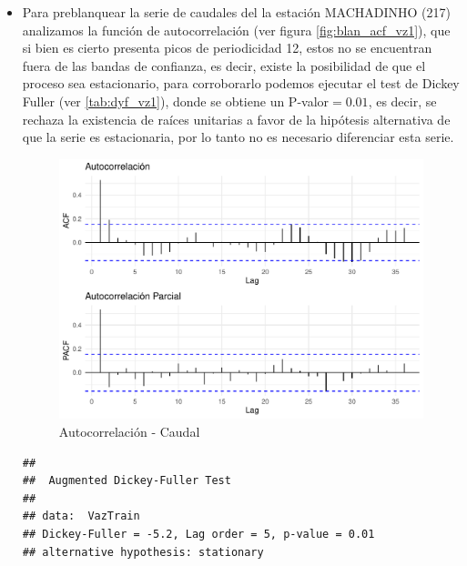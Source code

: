 \documentclass[12pt,oneside]{book}\usepackage[]{graphicx}\usepackage[]{color}
\makeatletter
\def\maxwidth{ %
  \ifdim\Gin@nat@width>\linewidth
    \linewidth
  \else
    \Gin@nat@width
  \fi
}
\newenvironment{kframe}{%
 \def\at@end@of@kframe{}%
 \ifinner\ifhmode%
  \def\at@end@of@kframe{\end{minipage}}%
  \begin{minipage}{\columnwidth}%
 \fi\fi%
 \def\FrameCommand##1{\hskip\@totalleftmargin \hskip-\fboxsep
 \colorbox{shadecolor}{##1}\hskip-\fboxsep
     \hskip-\linewidth \hskip-\@totalleftmargin \hskip\columnwidth}%
 \MakeFramed {\advance\hsize-\width
   \@totalleftmargin\z@ \linewidth\hsize
   \@setminipage}}%
 {\par\unskip\endMakeFramed%
 \at@end@of@kframe}
\newenvironment{knitrout}{}{} %
\theoremstyle{definition} %
\makeatother
\begin{document}
\begin{itemize}
\item Para preblanquear la serie de caudales del la estación MACHADINHO (217) analizamos la función de autocorrelación  (ver figura \ref{fig:blan_acf_vz1}), que si bien es cierto presenta picos de periodicidad 12, estos no se encuentran fuera de las bandas de confianza, es decir, existe la posibilidad de que el proceso sea estacionario, para corroborarlo podemos ejecutar el test de Dickey Fuller (ver \ref{tab:dyf_vz1}), donde se obtiene un P-valor$=0.01$, es decir, se rechaza la existencia de raíces unitarias a favor de la hipótesis alternativa de que la serie es estacionaria, por lo tanto no es necesario diferenciar esta serie.




\begin{knitrout}
\color{fgcolor}\begin{figure}[H]

{\centering \includegraphics[width=\maxwidth]{figure/unnamed-chunk-23-1} 

}

\caption{\label{fig:blan_acf_vz1} Autocorrelación - Caudal}\label{fig:unnamed-chunk-23}
\end{figure}


\end{knitrout}


\begin{knitrout}
\color{fgcolor}\begin{kframe}
\begin{verbatim}
## 
## 	Augmented Dickey-Fuller Test
## 
## data:  VazTrain
## Dickey-Fuller = -5.2, Lag order = 5, p-value = 0.01
## alternative hypothesis: stationary
\end{verbatim}
\end{kframe}
\end{knitrout}
\label{tab:dyf_vz1}





\end{itemize}
\end{document}
